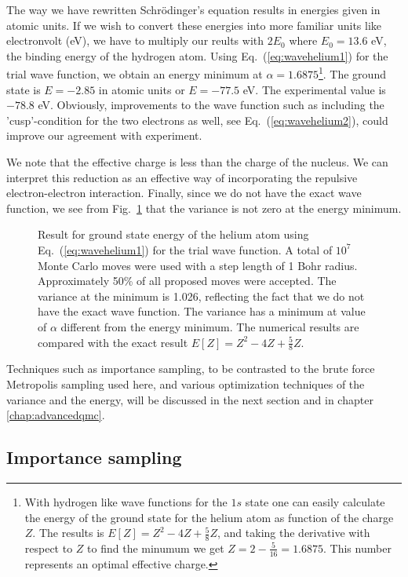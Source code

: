 The way we have rewritten Schr\"odinger's equation results in energies
given in atomic units. If we wish to convert these energies into more familiar
units like electronvolt (eV), we have to multiply our reults with
$2E_0$ where $E_0=13.6$ eV, the binding energy of the hydrogen atom.
Using Eq.~(\ref{eq:wavehelium1}) for the trial wave function, we obtain an
energy minimum at  $\alpha =1.6875$\footnote{With hydrogen like wave functions for the 
$1s$ state one can easily calculate the energy of the ground state for the helium atom as function of the charge $Z$. The results is $E[Z]= Z^2-4Z+\frac{5}{8}Z$, and taking the derivative with respect to $Z$ to find the minumum
we get $   Z=2-\frac{5}{16} = 1.6875$. This number represents an optimal effective charge.}.
The ground state is 
$E=-2.85$ in atomic units or $E=-77.5$ eV. The experimental value is
$-78.8$ eV. Obviously, improvements to the wave function such as 
including the 'cusp'-condition for the two electrons as well, see
Eq.~(\ref{eq:wavehelium2}), could improve our agreement with experiment.

We note that the effective charge is less than the charge of the nucleus.
We can interpret this reduction as an effective way of incorporating
the repulsive electron-electron interaction.
Finally, since we do not have the exact wave function, we see from
Fig.~\ref{fig:sigmahelium} that the variance is not zero at the energy 
minimum. 
\begin{figure}
\begin{center}

\end{center}
\caption{Result for ground state energy of the helium atom using
         Eq.~(\ref{eq:wavehelium1}) for the trial wave function. 
         A total of $10^7$ Monte Carlo moves were used
         with a step length of 1 Bohr radius. Approximately 50\% of all proposed moves were accepted.
The variance at the minimum is 1.026, reflecting the fact that we do not have the exact wave function. The variance has a minimum at value of $\alpha$ different from the energy minimum. The numerical results are compared with 
the exact result $E[Z]= Z^2-4Z+\frac{5}{8}Z$.\label{fig:sigmahelium}}
\end{figure}
Techniques such as importance sampling, to be contrasted to the brute force Metropolis sampling 
used here,
and various optimization techniques of the variance and the energy, will be discussed in the next section and in 
chapter \ref{chap:advancedqmc}.

\subsection{Importance sampling}


